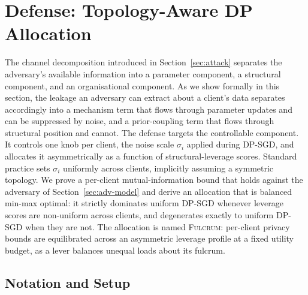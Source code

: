 \documentclass[letterpaper,journal]{IEEEtran}
\newcommand{\Fulcrum}{\textsc{Fulcrum}\xspace}
\begin{document}
\section{Defense: Topology-Aware DP Allocation}
\label{sec:defense}

The channel decomposition introduced in Section~\ref{sec:attack}
separates the adversary's available information into a parameter
component, a structural component, and an organisational component.
As we show formally in this section, the leakage an adversary can
extract about a client's data separates accordingly into a mechanism
term that flows through parameter updates and can be suppressed by
noise, and a prior-coupling term that flows through structural
position and cannot. The defense targets the controllable component.
It controls one knob per client, the noise scale $\sigma_i$ applied
during DP-SGD, and allocates it asymmetrically as a function of
structural-leverage scores. Standard practice sets $\sigma_i$
uniformly across clients, implicitly assuming a symmetric topology.
We prove a per-client mutual-information bound that holds against the adversary of Section~\ref{sec:adv-model} and derive an allocation
that is balanced min-max optimal: it strictly dominates uniform
DP-SGD whenever leverage scores are non-uniform across clients, and
degenerates exactly to uniform DP-SGD when they are not. The
allocation is named \Fulcrum: per-client privacy bounds are
equilibrated across an asymmetric leverage profile at a fixed utility
budget, as a lever balances unequal loads about its fulcrum.

\subsection{Notation and Setup}
\label{sec:defense-setup}
\end{document}
